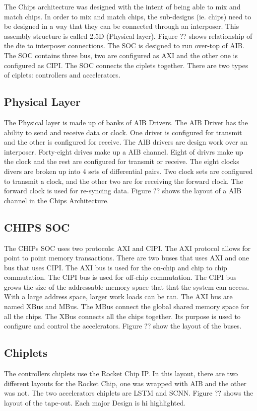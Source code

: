 \documentclass[../main.tex]{subfiles}
\begin{document}
The Chips architecture was designed with the intent of being able to mix and match chips. In order to mix and match chips, the sub-designs (ie. chips) need to be designed in a way that they can be connected through an interposer. This assembly structure is called 2.5D (Physical layer). Figure ?? shows relationship of the die to interposer connections. The SOC is designed to run over-top of AIB. The SOC contains three bus, two are configured as AXI and the other one is configured as CIPI. The SOC connects the ciplets together. There are two types of ciplets: controllers and accelerators.

\subsection{Physical Layer}
The Physical layer is made up of banks of AIB Drivers. The AIB Driver has the ability to send and receive data or clock. One driver is configured for transmit and the other is configured for receive. The AIB drivers are design work over an interposer. Forty-eight drives make up a AIB channel. Eight of drivrs make up the clock and the rest are configured for transmit or receive. The eight clocks divers are broken up into 4 sets of differential pairs. Two clock sets are configured to transmit a clock, and the other two are for receiving the forward clock. The forward clock is used for re-syncing data. Figure ?? shows the layout of a AIB channel in the Chips Architecture.

\subsection{CHIPS SOC}
The CHIPs SOC uses two protocols: AXI and CIPI. The AXI protocol allows for point to point memory transactions. There are two buses that uses AXI and one bus that uses CIPI. The AXI bus is used for the on-chip and chip to chip commutation. The CIPI bus is used for off-chip commutation. The CIPI bus grows the size of the addressable memory space that that the system can access. With a large address space, larger work loads can be ran. The AXI bus are named XBus and MBus. The MBus connect the global shared memory space for all the chips. The XBus connects all the chips together. Its purpose is used to configure and control the accelerators. Figure ?? show the layout of the buses.

\subsection{Chiplets}
The controllers chiplets use the Rocket Chip IP\cite{Asanović:EECS-2016-17}. In this layout, there are two different layouts for the Rocket Chip, one was wrapped with AIB and the other was not. The two accelerators chiplets are LSTM and SCNN. Figure ?? shows the layout of the tape-out. Each major Design is hi highlighted. 
\end{document}
